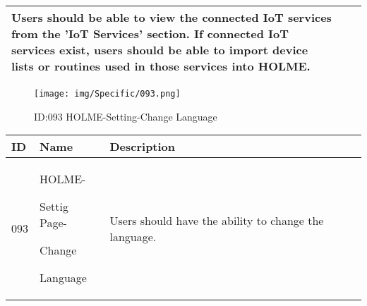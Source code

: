 \documentclass[conference]{IEEEtran}
\begin{document}
\begin{enumerate}
\begin{table}[h]
\begin{tabular}{|p{1cm}|p{1.8cm}|p{5.0cm}|}
       Users should be able to view the connected IoT services from the 'IoT Services' section. 
If connected IoT services exist, users should be able to import device lists or routines used in those services into HOLME.
         \\ \hline
    \end{tabular}
\end{table}
\begin{figure}[h]
\centering                                         
\texttt{[image: img/Specific/093.png]}
\caption{ID:093 HOLME-Setting-Change Language}
\end{figure}
\begin{table}[h]
\def\arraystretch{1.2} \small
    \begin{tabular}{|p{1cm}|p{1.8cm}|p{5.0cm}|}
        \hline
        ID & Name & Description\\ \hline
         093 \par  & HOLME-\par Settig Page- \par Change \par Language& 
       	Users should have the ability to change the language.
         \\ \hline
    \end{tabular}
\end{table}
\clearpage


\end{enumerate}
\end{document}
